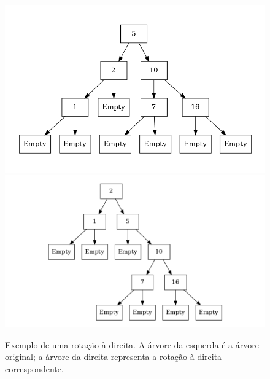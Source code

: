 \documentclass[a4paper]{article}
\begin{document}
    \begin{figure}
    \includegraphics[scale=0.27]{images/example1.png}
    \includegraphics[scale=0.27]{images/example3.png}
    \caption{Exemplo de uma rotação à direita. A árvore da esquerda
    é a árvore original; a árvore da direita representa a rotação à direita
    correspondente.}
    \label{exrot:fig}
    \end{figure}
\end{document}
